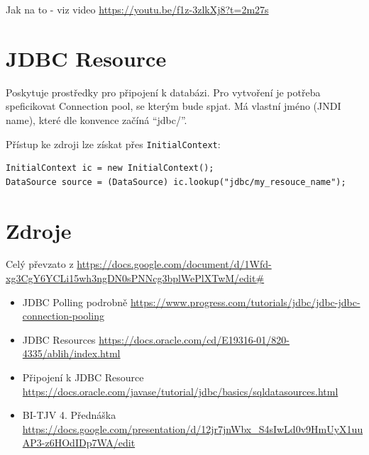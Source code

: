 \documentclass{szzclass}
\begin{document}
Jak na to - viz video \url{https://youtu.be/f1z-3zlkXj8?t=2m27s }

\section{JDBC Resource}
Poskytuje prostředky pro připojení k databázi. Pro vytvoření je potřeba speficikovat Connection pool, se kterým bude spjat. Má vlastní jméno (JNDI name), které dle konvence začíná “jdbc/”.

Přístup ke zdroji lze získat přes \texttt{InitialContext}:

\begin{verbatim}
InitialContext ic = new InitialContext();
DataSource source = (DataSource) ic.lookup("jdbc/my_resouce_name");
\end{verbatim}

\section{Zdroje}
Celý převzato z \url{https://docs.google.com/document/d/1Wfd-xg3CgY6YCLi15wh3ngDN0sPNNcg3bplWePlXTwM/edit#}
\begin{itemize}
\item JDBC Polling podrobně \url{https://www.progress.com/tutorials/jdbc/jdbc-jdbc-connection-pooling }
\item JDBC Resources \url{https://docs.oracle.com/cd/E19316-01/820-4335/ablih/index.html }
\item Připojení k JDBC Resource \url{https://docs.oracle.com/javase/tutorial/jdbc/basics/sqldatasources.html }
\item BI-TJV 4. Přednáška \url{https://docs.google.com/presentation/d/12jr7jnWbx_S4sIwLd0v9HmUyX1uuAP3-z6HOdIDp7WA/edit }
\end{itemize}
\end{document}
